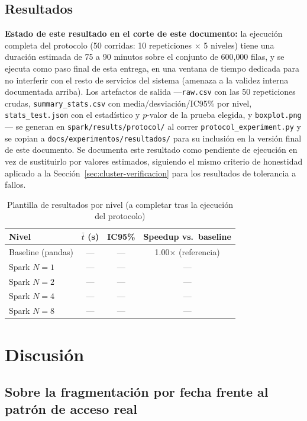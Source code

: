 \documentclass[11pt,letterpaper]{article}
\begin{document}
\subsection{Resultados}

\textbf{Estado de este resultado en el corte de este documento:} la ejecución completa del
protocolo (50 corridas: 10 repeticiones $\times$ 5 niveles) tiene una duración estimada de 75 a 90
minutos sobre el conjunto de 600{,}000 filas, y se ejecuta como paso final de esta entrega, en una
ventana de tiempo dedicada para no interferir con el resto de servicios del sistema (amenaza a la
validez interna documentada arriba). Los artefactos de salida —\texttt{raw.csv} con las 50
repeticiones crudas, \texttt{summary\_stats.csv} con media/desviación/IC95\% por nivel,
\texttt{stats\_test.json} con el estadístico y $p$-valor de la prueba elegida, y
\texttt{boxplot.png}— se generan en \texttt{spark/results/protocol/} al correr
\texttt{protocol\_experiment.py} y se copian a \texttt{docs/experimentos/resultados/} para su
inclusión en la versión final de este documento. Se documenta este resultado como pendiente de
ejecución en vez de sustituirlo por valores estimados, siguiendo el mismo criterio de honestidad
aplicado a la Sección~\ref{sec:cluster-verificacion} para los resultados de tolerancia a fallos.

\begin{table}[H]
\centering
\caption{Plantilla de resultados por nivel (a completar tras la ejecución del protocolo)}
\label{tab:amdahl-fit}
\begin{tabular}{@{}lccc@{}}
\toprule
\textbf{Nivel} & $\bar{t}$ (s) & IC95\% & \textbf{Speedup vs.\ baseline} \\
\midrule
Baseline (pandas) & --- & --- & 1.00$\times$ (referencia) \\
Spark $N=1$ & --- & --- & --- \\
Spark $N=2$ & --- & --- & --- \\
Spark $N=4$ & --- & --- & --- \\
Spark $N=8$ & --- & --- & --- \\
\bottomrule
\end{tabular}
\end{table}

\section{Discusión}
\label{sec:discusion}

\subsection{Sobre la fragmentación por fecha frente al patrón de acceso real}
\end{document}
